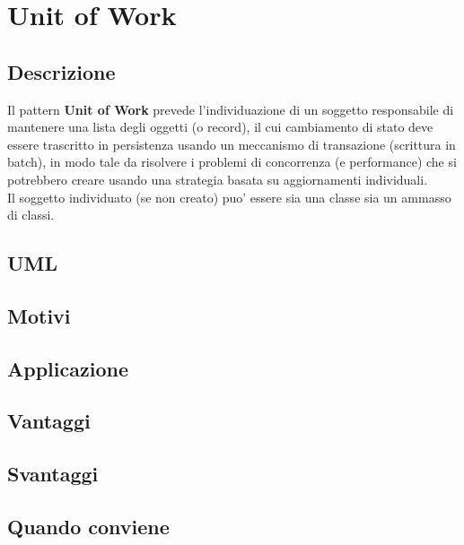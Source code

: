 \chapter{Unit of Work}

\section{Descrizione}

Il pattern \textbf{Unit of Work} prevede l'individuazione di un soggetto responsabile di mantenere una lista degli oggetti (o record), il cui cambiamento di stato deve essere trascritto in persistenza usando un meccanismo di transazione (scrittura in batch), in modo tale da risolvere i problemi di concorrenza (e performance) che si potrebbero creare usando una strategia basata su aggiornamenti individuali. \\

Il soggetto individuato (se non creato) puo' essere sia una classe sia un ammasso di classi.

\section{UML}

\section{Motivi}

\section{Applicazione}

\section{Vantaggi}

\section{Svantaggi}

\section{Quando conviene}

